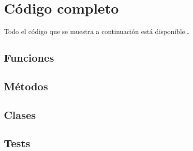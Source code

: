 \chapter{Código completo}

Todo el código que se muestra a continuación está disponible\ldots{}

\section{Funciones}
\label{sec:org052a819}
\section{Métodos}
\label{sec:org11e4ac3}
\section{Clases}
\label{sec:org11c3bd2}
\section{Tests}
\label{sec:orge1922f7}
